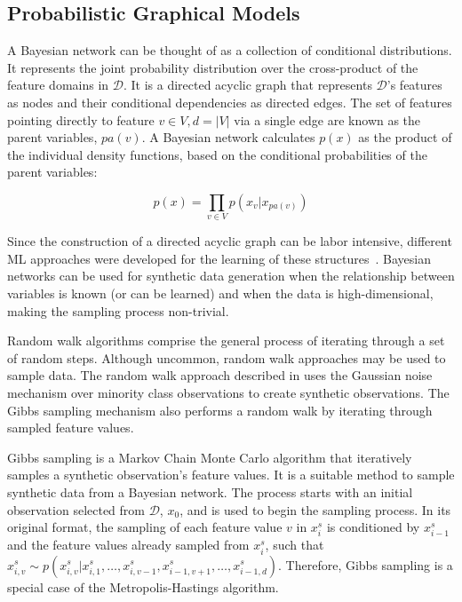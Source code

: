 \subsection{Probabilistic Graphical Models}

A Bayesian network can be thought of as a collection of
conditional distributions. It represents the joint probability distribution
over the cross-product of the feature domains in $\mathcal{D}$. It is a
directed acyclic graph that represents $\mathcal{D}$'s features as nodes and
their conditional dependencies as directed edges. The set of features pointing
directly to feature $v \in V, d=|V|$ via a single edge are known as the parent
variables, $pa(v)$. A Bayesian network calculates $p(x)$ as the product of the
individual density functions, based on the conditional probabilities of the
parent variables:

\begin{equation}
    p(x) = \prod_{v \in V} p(x_v | x_{pa(v)})
\end{equation}

Since the construction of a directed acyclic graph can be labor intensive,
different ML approaches were developed for the learning of these
structures~\cite{yu2019dag}. Bayesian networks can be used for synthetic data
generation when the relationship between variables is known (or can be
learned) and when the data is high-dimensional, making the sampling process
non-trivial.

Random walk algorithms comprise the general process of iterating through a set
of random steps. Although uncommon, random walk approaches may be used to
sample data. The random walk approach described in \cite{zhang2014rwo} uses
the Gaussian noise mechanism over minority class observations to create
synthetic observations. The Gibbs sampling mechanism also performs a random
walk by iterating through sampled feature values.

Gibbs sampling is a Markov Chain Monte Carlo algorithm that iteratively
samples a synthetic observation's feature values. It is a suitable method to
sample synthetic data from a Bayesian network. The process starts with an
initial observation selected from $\mathcal{D}$, $x_0$, and is used to begin
the sampling process. In its original format, the sampling of each feature
value $v$ in $x^s_i$ is conditioned by $x^s_{i-1}$ and the feature values
already sampled from $x^s_i$, such that $x^s_{i, v} \sim p(x^s_{i, v} |
x^s_{i, 1}, \ldots, x^s_{i, v-1}, x^s_{i-1, v+1}, \dots, x^s_{i-1, d})$.
Therefore, Gibbs sampling is a special case of the Metropolis-Hastings
algorithm.

